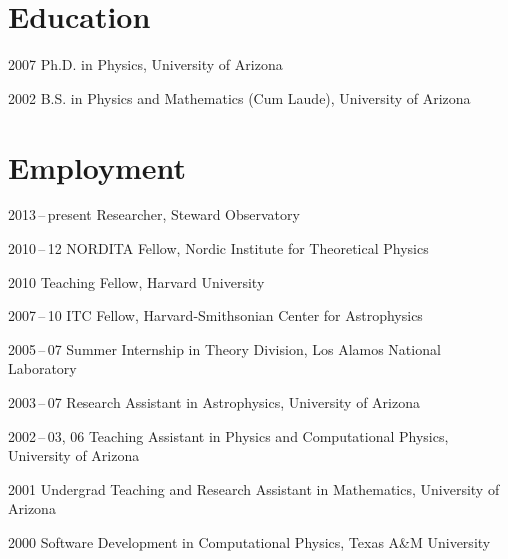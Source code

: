 \section*{Education}

\begin{tlist}

\item[2007] Ph.D. in Physics, University of Arizona

\item[2002] B.S. in Physics and Mathematics (Cum Laude), University of Arizona

\end{tlist}

\section*{Employment}

\begin{tlist}

\item[2013\,--\,present] Researcher, Steward Observatory

\item[2010\,--\,12] NORDITA Fellow, Nordic Institute for Theoretical Physics

\item[2010] Teaching Fellow, Harvard University

\item[2007\,--\,10] ITC Fellow, Harvard-Smithsonian Center for Astrophysics

\item[2005\,--\,07] Summer Internship in Theory Division, Los Alamos National Laboratory

\item[2003\,--\,07] Research Assistant in Astrophysics, University of Arizona

\item[2002\,--\,03, 06] Teaching Assistant in Physics and Computational Physics, University of Arizona

\item[2001] Undergrad Teaching and Research Assistant in Mathematics, University of Arizona

\item[2000] Software Development in Computational Physics, Texas A\&M University

\end{tlist}

